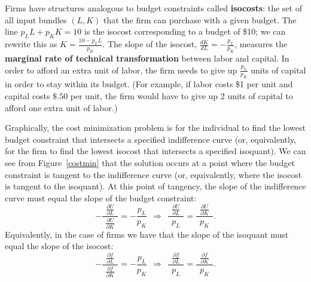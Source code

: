 Firms have structures analogous to budget constraints called \textbf{isocosts}: the set of all input bundles $(L, K)$ that the firm can purchase with a given budget. The line $p_L L + p_K K=10$ is the isocost corresponding to a budget of \$10; we can rewrite this as $\displaystyle K=\frac{10-p_L L}{p_K}$. The slope of the isocost, $\displaystyle \frac{dK}{dL}=-\frac{p_L}{p_K}$, measures the \textbf{marginal rate of technical transformation} between labor and capital. In order to afford an extra unit of labor, the firm needs to give up $\displaystyle \frac{p_L}{p_K}$ units of capital in order to stay within its budget. (For example, if labor costs \$1 per unit and capital costs $\$.50$ per unit, the firm would have to give up 2 units of capital to afford one extra unit of labor.)

Graphically, the cost minimization problem is for the individual to find the lowest budget constraint that intersects a specified indifference curve (or, equivalently, for the firm to find the lowest isocost that intersects a specified isoquant). We can see from Figure~\ref{costmin} that the solution occurs at a point where the budget constraint is tangent to the indifference curve (or, equivalently, where the isocost is tangent to the isoquant). At this point of tangency, the slope of the indifference curve must equal the slope of the budget constraint:
\[
-\frac{\ \ \frac{\partial U}{\partial L}\ \ }{\frac{\partial
U}{\partial K}}=-\frac{p_L}{p_K}\ \ \Longrightarrow \ \ \frac{\ \
\frac{\partial U}{\partial L}\ \ }{p_L}=\frac{\ \ \frac{\partial
U}{\partial K}\ \ }{p_K}.
\]
Equivalently, in the case of firms we have that the slope of the isoquant must equal the slope of the isocost:
\[
-\frac{\ \ \frac{\partial f}{\partial L}\ \ }{\frac{\partial
f}{\partial K}}=-\frac{p_L}{p_K}\ \ \Longrightarrow \ \ \frac{\ \
\frac{\partial f}{\partial L}\ \ }{p_L}=\frac{\ \ \frac{\partial
f}{\partial K}\ \ }{p_K}.
\]

